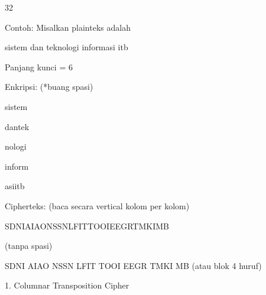 \documentclass{article}
\begin{document}

32

Contoh: Misalkan plainteks adalah


sistem dan teknologi informasi itb

Panjang kunci = 6

 Enkripsi:                             (*buang spasi)


sistem


dantek


nologi


inform


asiitb

 Cipherteks: (baca secara vertical kolom per kolom) 

 SDNIAIAONSSNLFITTOOIEEGRTMKIMB 

   (tanpa spasi)  

 SDNI AIAO NSSN LFIT TOOI EEGR TMKI MB (atau blok 4 huruf)

1. Columnar Transposition Cipher
\end{document}
